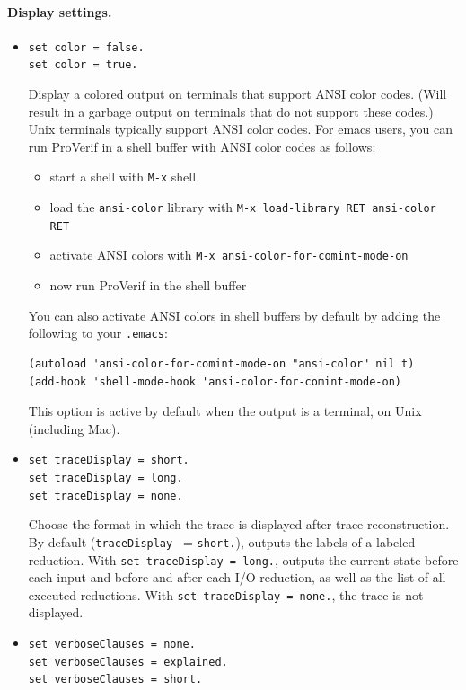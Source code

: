 \documentclass{book}
\begin{document}
\paragraph{Display settings.}
\begin{itemize}

\item \lstinline{set color = false.}\\
\lstinline{set color = true.}

  Display a colored output on terminals that support ANSI color
  codes. (Will result in a garbage output on terminals that do not
  support these codes.) Unix terminals typically support ANSI color
  codes. For emacs users, you can run ProVerif in a shell buffer with
  ANSI color codes as follows:
\begin{itemize}
\item start a shell with \texttt{M-x} shell
\item load the \texttt{ansi-color} library with \texttt{M-x load-library RET ansi-color RET}
\item activate ANSI colors with \texttt{M-x ansi-color-for-comint-mode-on}
\item now run ProVerif in the shell buffer
\end{itemize}
You can also activate ANSI colors in shell buffers by default by adding the following to your \texttt{.emacs}:
\begin{verbatim}
(autoload 'ansi-color-for-comint-mode-on "ansi-color" nil t)
(add-hook 'shell-mode-hook 'ansi-color-for-comint-mode-on)
\end{verbatim}
This option is active by default when the output is a terminal,
on Unix (including Mac).

\item \lstinline{set traceDisplay = short.}\\
\lstinline{set traceDisplay = long.}\\
\lstinline{set traceDisplay = none.}

Choose the format in which the trace is displayed after trace reconstruction.
By default (\lstinline{traceDisplay } = \lstinline{short.}), outputs the labels of
a labeled reduction.
With \lstinline{set traceDisplay = long.}, outputs the current state
before each input and before and after each I/O reduction, as well as
the list of all executed reductions.
With \lstinline{set traceDisplay = none.}, the trace is not displayed.

\item \lstinline{set verboseClauses = none.}\\
\lstinline{set verboseClauses = explained.}\\
\lstinline{set verboseClauses = short.}


\end{itemize}
\end{document}
